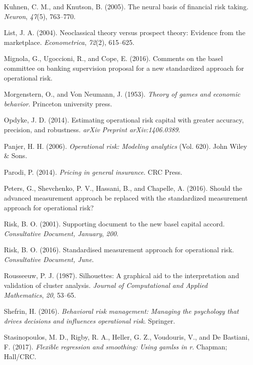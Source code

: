\documentclass[]{DissertateUSU}
\begin{document}
\hypertarget{ref-kuhnen2005neural}{}
Kuhnen, C. M., and Knutson, B. (2005). The neural basis of financial
risk taking. \emph{Neuron}, \emph{47}(5), 763--770.

\hypertarget{ref-list2004neoclassical}{}
List, J. A. (2004). Neoclassical theory versus prospect theory: Evidence
from the marketplace. \emph{Econometrica}, \emph{72}(2), 615--625.

\hypertarget{ref-mignola2016comments}{}
Mignola, G., Ugoccioni, R., and Cope, E. (2016). Comments on the basel
committee on banking supervision proposal for a new standardized
approach for operational risk.

\hypertarget{ref-morgenstern1953theory}{}
Morgenstern, O., and Von Neumann, J. (1953). \emph{Theory of games and
economic behavior}. Princeton university press.

\hypertarget{ref-opdyke2014estimating}{}
Opdyke, J. D. (2014). Estimating operational risk capital with greater
accuracy, precision, and robustness. \emph{arXiv Preprint
arXiv:1406.0389}.

\hypertarget{ref-panjer2006operational}{}
Panjer, H. H. (2006). \emph{Operational risk: Modeling analytics} (Vol.
620). John Wiley \& Sons.

\hypertarget{ref-parodi2014pricing}{}
Parodi, P. (2014). \emph{Pricing in general insurance}. CRC Press.

\hypertarget{ref-peters2016should}{}
Peters, G., Shevchenko, P. V., Hassani, B., and Chapelle, A. (2016).
Should the advanced measurement approach be replaced with the
standardized measurement approach for operational risk?

\hypertarget{ref-risk2001supporting}{}
Risk, B. O. (2001). Supporting document to the new basel capital accord.
\emph{Consultative Document, January}, \emph{200}.

\hypertarget{ref-risk2016supporting}{}
Risk, B. O. (2016). Standardised measurement approach for operational
risk. \emph{Consultative Document, June}.

\hypertarget{ref-rousseeuw1987silhouettes}{}
Rousseeuw, P. J. (1987). Silhouettes: A graphical aid to the
interpretation and validation of cluster analysis. \emph{Journal of
Computational and Applied Mathematics}, \emph{20}, 53--65.

\hypertarget{ref-shefrin2016behavioral}{}
Shefrin, H. (2016). \emph{Behavioral risk management: Managing the
psychology that drives decisions and influences operational risk}.
Springer.

\hypertarget{ref-stasinopoulos2017flexible}{}
Stasinopoulos, M. D., Rigby, R. A., Heller, G. Z., Voudouris, V., and De
Bastiani, F. (2017). \emph{Flexible regression and smoothing: Using
gamlss in r}. Chapman; Hall/CRC.
\end{document}
